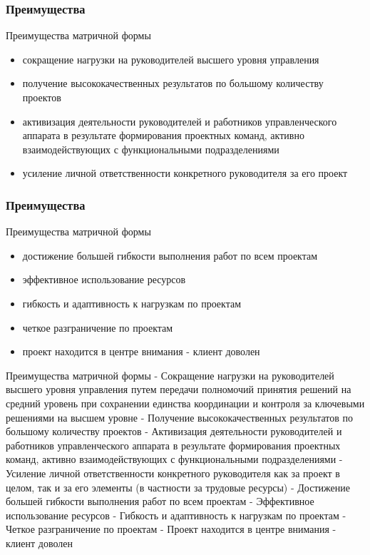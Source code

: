 \documentclass{../industrial-development}
\begin{document}
\begin{frame} \frametitle{Преимущества}
  \begin{block}{Преимущества матричной формы}
  \end{block}
  
  \begin{itemize}
  \item сокращение нагрузки на руководителей высшего уровня управления 
  \item получение высококачественных результатов по большому количеству проектов
  \item активизация деятельности руководителей и работников управленческого аппарата в результате формирования проектных команд, активно взаимодействующих с функциональными подразделениями
  \item усиление личной ответственности конкретного руководителя за его проект
  \end{itemize}
\end{frame}

\begin{frame} \frametitle{Преимущества}
  \begin{block}{Преимущества матричной формы}
  \end{block}
  
  \begin{itemize}
 \item достижение большей гибкости выполнения работ по всем проектам
 \item эффективное использование ресурсов
 \item гибкость и адаптивность к нагрузкам по проектам
 \item четкое разграничение по проектам
 \item проект находится в центре внимания - клиент доволен
  \end{itemize}
\end{frame}

\lecturenotes
Преимущества матричной формы
- Сокращение нагрузки на руководителей высшего уровня управления путем передачи полномочий принятия решений на средний уровень при сохранении единства координации и контроля за ключевыми решениями на высшем уровне
- Получение высококачественных результатов по большому количеству проектов
- Активизация деятельности руководителей и работников управленческого аппарата в результате формирования проектных команд, активно взаимодействующих с функциональными подразделениями
- Усиление личной ответственности конкретного руководителя как за проект в целом, так и за его элементы (в частности за трудовые ресурсы)
- Достижение большей гибкости выполнения работ по всем проектам
- Эффективное использование ресурсов
- Гибкость и адаптивность к нагрузкам по проектам
- Четкое разграничение по проектам
- Проект находится в центре внимания - клиент доволен
\end{document}
